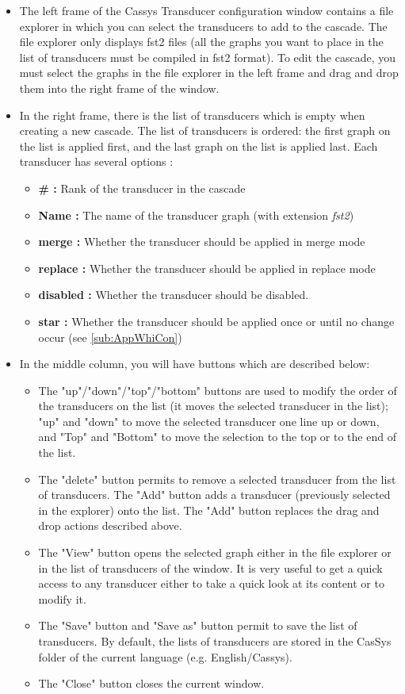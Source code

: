 \begin{itemize}
	\item The left frame of the Cassys Transducer configuration window contains a file explorer in which you can select the transducers to add to the cascade. 
	The file explorer only displays fst2 files (all the graphs you want to place in the list of transducers must be compiled in fst2 format). 
	To edit the cascade, you must select the graphs in the file explorer in the left frame and drag and drop them into the right frame of the window.
	\item In the right frame, there is the list of transducers which is empty when
	creating a new cascade. The list of transducers is ordered: the first graph on the list is applied
	first, and the last graph on the list is applied last. Each transducer has
	several options :
		\begin{itemize}
		  \item \textbf{\# :} Rank of the transducer in the cascade
		  \item \textbf{Name :} The name of the transducer graph (with extension
		  \emph{fst2})
		  \item \textbf{merge :} Whether the transducer should be applied in merge
		  mode
		  \item \textbf{replace :} Whether the transducer should be applied in replace
		  mode
		  \item \textbf{disabled :} Whether the transducer should be disabled. 
		  \item \textbf{star :} Whether the transducer should be applied once or until
		  no change occur (see \ref{sub:AppWhiCon})
		 \end{itemize}
	 
	\item In the middle column, you will have buttons which are described below: 
		\begin{itemize}
			\item The "up"/"down"/"top"/"bottom" buttons are used to modify the order of the transducers on the list (it moves the selected transducer in the list); 
			"up" and "down" to move the selected transducer one line up or down, and "Top" and "Bottom" to move the selection to the top or to the end of the list.
			\item  The "delete" button permits to remove a selected transducer from the list of transducers. The "Add" button adds a transducer (previously selected in the explorer) onto the list. The "Add" button replaces the drag and drop actions described above. 
			\item The "View" button opens the selected graph either in the file explorer or in the list of transducers of the window. It is very useful to get a quick access to any transducer either to take a quick look at its content or to modify it.
			\item The "Save" button and "Save as" button permit to save the list of transducers. By default, the lists of transducers are stored in the CasSys folder of the current language (e.g. English/Cassys).
			\item The "Close" button closes the current window.
		\end{itemize}
\end{itemize}

